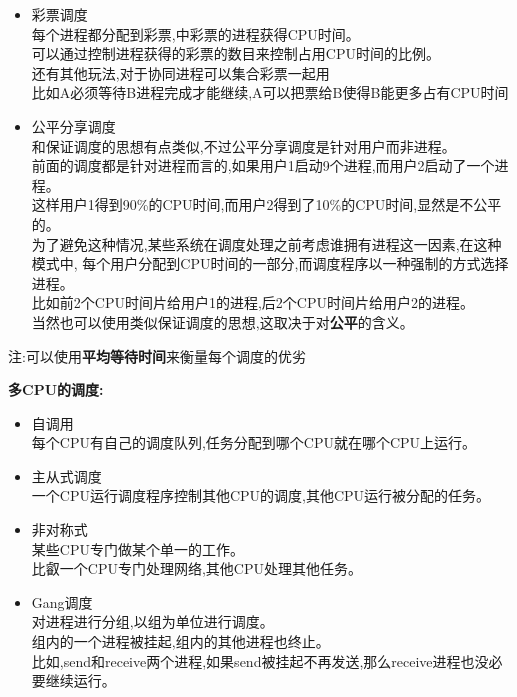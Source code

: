 \documentclass[UTF8,a4paper]{ctexart}
\newcommand{\spaceline}{\vspace{\baselineskip}}
\begin{document}
\begin{itemize}
      \item 彩票调度\\
      每个进程都分配到彩票,中彩票的进程获得CPU时间。\\
      可以通过控制进程获得的彩票的数目来控制占用CPU时间的比例。\\
      还有其他玩法,对于协同进程可以集合彩票一起用\\
      比如A必须等待B进程完成才能继续,A可以把票给B使得B能更多占有CPU时间

      \item 公平分享调度\\
      和保证调度的思想有点类似,不过公平分享调度是针对用户而非进程。\\
      前面的调度都是针对进程而言的,如果用户1启动9个进程,而用户2启动了一个进程。\\
      这样用户1得到90\%的CPU时间,而用户2得到了10\%的CPU时间,显然是不公平的。\\
      为了避免这种情况,某些系统在调度处理之前考虑谁拥有进程这一因素,在这种模式中,
      每个用户分配到CPU时间的一部分,而调度程序以一种强制的方式选择进程。\\
      比如前2个CPU时间片给用户1的进程,后2个CPU时间片给用户2的进程。\\
      当然也可以使用类似保证调度的思想,这取决于对\textbf{公平}的含义。

    \end{itemize}

    注:可以使用\textbf{平均等待时间}来衡量每个调度的优劣

    \spaceline
    \textbf{多CPU的调度:}
    \begin{itemize}
      \item 自调用\\
      每个CPU有自己的调度队列,任务分配到哪个CPU就在哪个CPU上运行。
      \item 主从式调度\\
      一个CPU运行调度程序控制其他CPU的调度,其他CPU运行被分配的任务。
      \item 非对称式\\
      某些CPU专门做某个单一的工作。\\
      比叡一个CPU专门处理网络,其他CPU处理其他任务。
      \item Gang调度\\
      对进程进行分组,以组为单位进行调度。\\
      组内的一个进程被挂起,组内的其他进程也终止。\\
      比如,send和receive两个进程,如果send被挂起不再发送,那么receive进程也没必要继续运行。
    \end{itemize}
\end{document}
